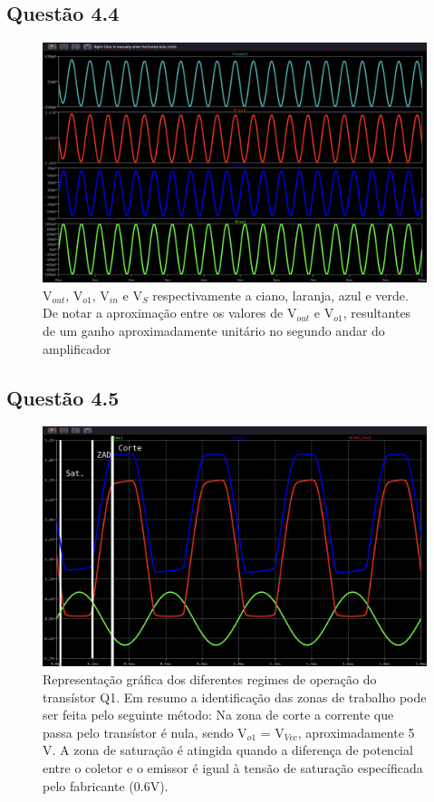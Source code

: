\documentclass[a4paper,12pt]{article}
\begin{document}
			\subsection{Questão 4.4}
				\begin{figure}[H]
  					\centering
  					\captionsetup{justification=centering}
  					\includegraphics[scale=0.2\textscale]  {4.4.png}
					\caption{V$_{out}$, V$_{o1}$, V$_{in}$ e V$_S$ respectivamente a ciano, laranja, azul e verde. De notar a aproximação entre os valores de V$_{out}$ e V$_{o1}$, resultantes de um ganho aproximadamente unitário no segundo andar do amplificador}
				\end{figure}


			\subsection{Questão 4.5}
				\begin{figure}[H]
  					\centering
  					\captionsetup{justification=centering}
  					\includegraphics[scale=0.1\textscale]  {4.5.png}
					\caption{Representação gráfica dos diferentes regimes de operação do transístor Q1. Em resumo a identificação das zonas de trabalho pode ser feita pelo seguinte método: Na zona de corte a corrente que passa pelo transístor é nula, sendo V$_{o1}$ = V$_{Vcc}$, aproximadamente 5 V. A zona de saturação é atingida quando a diferença de potencial entre o coletor e o emissor é igual à tensão de saturação específicada pelo fabricante (0.6V).}
					

				\end{figure}
\end{document}
